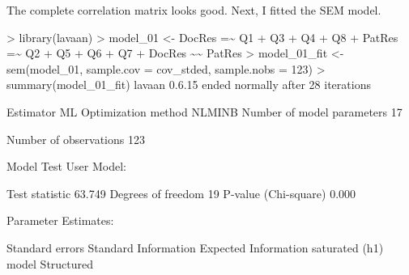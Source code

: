 \documentclass[
]{article}
\newenvironment{Shaded}{\begin{snugshade}}{\end{snugshade}}
\newcommand{\AttributeTok}[1]{\textcolor[rgb]{0.77,0.63,0.00}{#1}}
\newcommand{\DecValTok}[1]{\textcolor[rgb]{0.00,0.00,0.81}{#1}}
\newcommand{\FloatTok}[1]{\textcolor[rgb]{0.00,0.00,0.81}{#1}}
\newcommand{\FunctionTok}[1]{\textcolor[rgb]{0.00,0.00,0.00}{#1}}
\newcommand{\NormalTok}[1]{#1}
\newcommand{\OtherTok}[1]{\textcolor[rgb]{0.56,0.35,0.01}{#1}}
\newcommand{\SpecialCharTok}[1]{\textcolor[rgb]{0.00,0.00,0.00}{#1}}
\newcommand{\StringTok}[1]{\textcolor[rgb]{0.31,0.60,0.02}{#1}}
\begin{document}
The complete correlation matrix looks good. Next, I fitted the SEM
model.

\begin{Shaded}
\begin{Highlighting}[]
\SpecialCharTok{\textgreater{}} \FunctionTok{library}\NormalTok{(lavaan)}
\SpecialCharTok{\textgreater{}}\NormalTok{ model\_01 }\OtherTok{\textless{}{-}} \StringTok{\textquotesingle{}DocRes =\textasciitilde{} Q1 + Q3 + Q4 + Q8}
\StringTok{+              PatRes =\textasciitilde{} Q2 + Q5 + Q6 + Q7}
\StringTok{+              DocRes \textasciitilde{}\textasciitilde{} PatRes\textquotesingle{}}
\SpecialCharTok{\textgreater{}}\NormalTok{ model\_01\_fit }\OtherTok{\textless{}{-}} \FunctionTok{sem}\NormalTok{(model\_01, }\AttributeTok{sample.cov =}\NormalTok{ cov\_stded, }\AttributeTok{sample.nobs =} \DecValTok{123}\NormalTok{)}
\SpecialCharTok{\textgreater{}} \FunctionTok{summary}\NormalTok{(model\_01\_fit)}
\NormalTok{lavaan }\DecValTok{0}\NormalTok{.}\FloatTok{6.15}\NormalTok{ ended normally after }\DecValTok{28}\NormalTok{ iterations}

\NormalTok{  Estimator                                         ML}
\NormalTok{  Optimization method                           NLMINB}
\NormalTok{  Number of model parameters                        }\DecValTok{17}

\NormalTok{  Number of observations                           }\DecValTok{123}

\NormalTok{Model Test User Model}\SpecialCharTok{:}
                                                      
\NormalTok{  Test statistic                                }\FloatTok{63.749}
\NormalTok{  Degrees of freedom                                }\DecValTok{19}
\NormalTok{  P}\SpecialCharTok{{-}}\FunctionTok{value}\NormalTok{ (Chi}\SpecialCharTok{{-}}\NormalTok{square)                           }\FloatTok{0.000}

\NormalTok{Parameter Estimates}\SpecialCharTok{:}

\NormalTok{  Standard errors                             Standard}
\NormalTok{  Information                                 Expected}
\NormalTok{  Information }\FunctionTok{saturated}\NormalTok{ (h1) model          Structured}


\end{Highlighting}
\end{Shaded}
\end{document}
